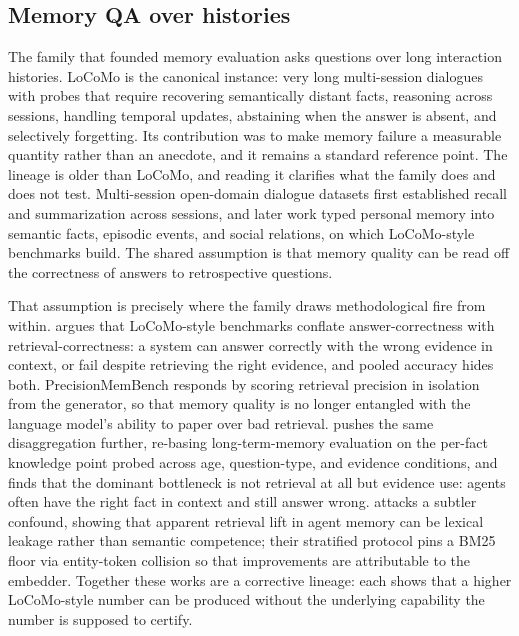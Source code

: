 \subsection{Memory QA over histories}

The family that founded memory evaluation asks questions over long interaction histories. LoCoMo \citep{maharana2024evaluatinglongtermconversationalmemory} is the canonical instance: very long multi-session dialogues with probes that require recovering semantically distant facts, reasoning across sessions, handling temporal updates, abstaining when the answer is absent, and selectively forgetting. Its contribution was to make memory failure a measurable quantity rather than an anecdote, and it remains a standard reference point. The lineage is older than LoCoMo, and reading it clarifies what the family does and does not test. Multi-session open-domain dialogue datasets first established recall and summarization across sessions, and later work typed personal memory into semantic facts, episodic events, and social relations, on which LoCoMo-style benchmarks build. The shared assumption is that memory quality can be read off the correctness of answers to retrospective questions.

That assumption is precisely where the family draws methodological fire from within. \citet{flynt2026precisionmembench} argues that LoCoMo-style benchmarks conflate answer-correctness with retrieval-correctness: a system can answer correctly with the wrong evidence in context, or fail despite retrieving the right evidence, and pooled accuracy hides both. PrecisionMemBench responds by scoring retrieval precision in isolation from the generator, so that memory quality is no longer entangled with the language model's ability to paper over bad retrieval. \citet{long2026memtrace} pushes the same disaggregation further, re-basing long-term-memory evaluation on the per-fact knowledge point probed across age, question-type, and evidence conditions, and finds that the dominant bottleneck is not retrieval at all but evidence use: agents often have the right fact in context and still answer wrong. \citet{deng2026entitycollision} attacks a subtler confound, showing that apparent retrieval lift in agent memory can be lexical leakage rather than semantic competence; their stratified protocol pins a BM25 floor via entity-token collision so that improvements are attributable to the embedder. Together these works are a corrective lineage: each shows that a higher LoCoMo-style number can be produced without the underlying capability the number is supposed to certify.


